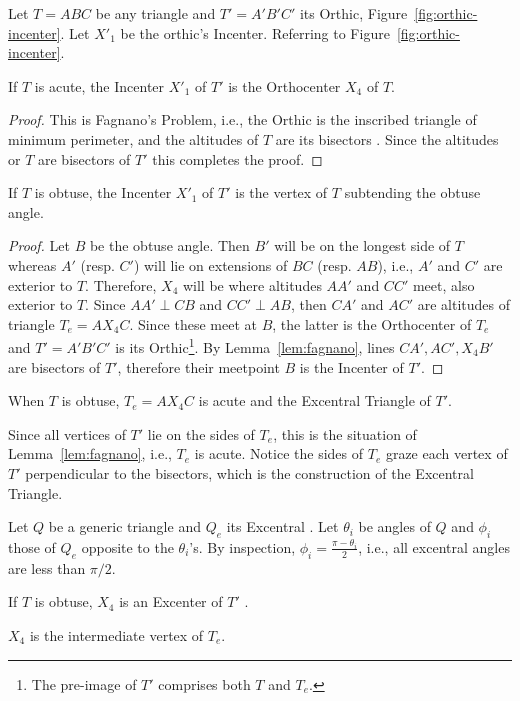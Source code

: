 Let $T=ABC$ be any triangle and $T'=A'B'C'$ its Orthic, Figure~\ref{fig:orthic-incenter}. Let $X'_1$ be the orthic's Incenter. Referring to Figure~\ref{fig:orthic-incenter}.

\begin{lemma}
If $T$ is acute, the Incenter $X'_1$ of $T'$ is the Orthocenter $X_4$ of $T$.
\label{lem:fagnano}
\end{lemma}

\begin{proof}
This is Fagnano's Problem, i.e., the Orthic is the inscribed triangle of minimum perimeter, and the altitudes of $T$ are its bisectors \cite[Section 3.3]{rozikov2018-billiards}. Since the altitudes or $T$ are bisectors of $T'$ this completes the proof.
\end{proof}

\begin{lemma*}[\ref{lem:pinned}]
If $T$ is obtuse, the Incenter $X'_1$ of $T'$ is the vertex of $T$ subtending the obtuse angle.
\end{lemma*}

\begin{proof}
Let $B$ be the obtuse angle. Then $B'$ will be on the longest side of $T$ whereas $A'$ (resp. $C'$) will lie on extensions of $BC$ (resp. $AB$), i.e., $A'$ and $C'$ are exterior to $T$. Therefore, $X_4$ will be where altitudes $AA'$ and $CC'$ meet, also exterior to $T$. Since $AA'{\perp}CB$ and $CC'{\perp}AB$, then $CA'$ and $AC'$ are altitudes of triangle $T_e=A{X_4}C$. Since these meet at $B$, the latter is the Orthocenter of $T_e$ and $T'=A'B'C'$ is its Orthic\footnote{The pre-image of $T'$ comprises both $T$ and $T_e$.}. By Lemma~\ref{lem:fagnano}, lines $CA',AC',{X_4}B'$ are bisectors of $T'$, therefore their meetpoint $B$ is the Incenter of $T'$. 
\end{proof}

\begin{corollary}
When $T$ is obtuse, $T_e = A{X_4}C$ is acute and the Excentral Triangle of $T'$.
\end{corollary}

Since all vertices of $T'$ lie on the sides of $T_e$, this is the situation of Lemma~\ref{lem:fagnano}, i.e., $T_e$ is acute. Notice the sides of $T_e$ graze each vertex of $T'$ perpendicular to the bisectors, which is the construction of the Excentral Triangle.

Let $Q$ be a generic triangle and $Q_e$ its Excentral \cite{mw}. Let $\theta_i$ be angles of $Q$ and $\phi_i$ those of $Q_e$ opposite to the $\theta_i$'s. By inspection, $\phi_i=\frac{\pi-\theta_i}{2}$, i.e., all excentral angles are less than $\pi/2$.

\begin{corollary}
If $T$ is obtuse, $X_4$ is an Excenter of $T'$ \cite{coxeter67}.
\end{corollary}

$X_4$ is the intermediate vertex of $T_e$.
